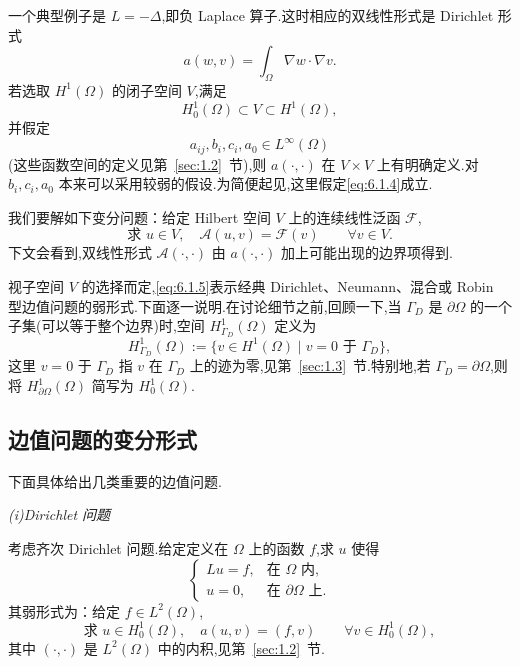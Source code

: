 一个典型例子是 \(L=-\Delta\),即负 Laplace 算子.这时相应的双线性形式是 Dirichlet 形式
\[
  a(w,v)=\int_\Omega\nabla w\cdot\nabla v.
\]
若选取 \(H^1(\Omega)\) 的闭子空间 \(V\),满足
\begin{equation}\label{eq:6.1.3}
  H_0^1(\Omega)\subset V\subset H^1(\Omega),
\end{equation}
并假定
\begin{equation}\label{eq:6.1.4}
  a_{ij},b_i,c_i,a_0\in L^\infty(\Omega)
\end{equation}
(这些函数空间的定义见第~\ref{sec:1.2}~节),则 \(a(\cdot,\cdot)\) 在 \(V\times V\) 上有明确定义.对 \(b_i,c_i,a_0\) 本来可以采用较弱的假设.为简便起见,这里假定\eqref{eq:6.1.4}成立.

我们要解如下变分问题：给定 Hilbert 空间 \(V\) 上的连续线性泛函 \(\mathcal F\),
\begin{equation}\label{eq:6.1.5}
  \text{求 }u\in V,\quad \mathcal A(u,v)=\mathcal F(v)
    \qquad\forall v\in V.
\end{equation}
下文会看到,双线性形式 \(\mathcal A(\cdot,\cdot)\) 由 \(a(\cdot,\cdot)\) 加上可能出现的边界项得到.

视子空间 \(V\) 的选择而定,\eqref{eq:6.1.5}表示经典 Dirichlet、Neumann、混合或 Robin 型边值问题的弱形式.下面逐一说明.在讨论细节之前,回顾一下,当 \(\Gamma_D\) 是 \(\partial\Omega\) 的一个子集(可以等于整个边界)时,空间 \(H^1_{\Gamma_D}(\Omega)\) 定义为
\begin{equation}\label{eq:6.1.6}
  H^1_{\Gamma_D}(\Omega):=\{v\in H^1(\Omega)\mid v=0\text{ 于 }\Gamma_D\},
\end{equation}
这里 \(v=0\) 于 \(\Gamma_D\) 指 \(v\) 在 \(\Gamma_D\) 上的迹为零,见第~\ref{sec:1.3}~节.特别地,若 \(\Gamma_D=\partial\Omega\),则将 \(H^1_{\partial\Omega}(\Omega)\) 简写为 \(H_0^1(\Omega)\).

\subsection{边值问题的变分形式}\label{sec:6.1.1}

下面具体给出几类重要的边值问题.

\medskip
\noindent\textit{(i)Dirichlet 问题}

考虑齐次 Dirichlet 问题.给定定义在 \(\Omega\) 上的函数 \(f\),求 \(u\) 使得
\begin{equation}\label{eq:6.1.7}
  \begin{cases}
    Lu=f,&\text{在 }\Omega\text{ 内},\\
    u=0,&\text{在 }\partial\Omega\text{ 上}.
  \end{cases}
\end{equation}
其弱形式为：给定 \(f\in L^2(\Omega)\),
\begin{equation}\label{eq:6.1.8}
  \text{求 }u\in H_0^1(\Omega),\quad a(u,v)=(f,v)
    \qquad\forall v\in H_0^1(\Omega),
\end{equation}
其中 \((\cdot,\cdot)\) 是 \(L^2(\Omega)\) 中的内积,见第~\ref{sec:1.2}~节.

